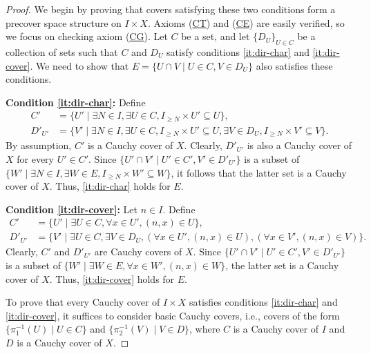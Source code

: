 \documentclass[pdflatex,sn-mathphys-num]{sn-jnl}
\newcommand{\axref}[1]{(\hyperref[ax:#1]{#1})}
\theoremstyle{definition}
\theoremstyle{remark}
\numberwithin{figure}{section}
\begin{document}
\begin{proof}

We begin by proving that covers satisfying these two conditions form a precover space structure on $I \times X$.
Axioms \axref{CT} and \axref{CE} are easily verified, so we focus on checking axiom \axref{CG}.
Let $C$ be a set, and let $\{ D_U \}_{U \in C}$ be a collection of sets such that $C$ and $D_U$ satisfy conditions \eqref{it:dir-char} and \eqref{it:dir-cover}.
We need to show that $E = \{ U \cap V \mid U \in C, V \in D_U \}$ also satisfies these conditions.

\textbf{Condition \eqref{it:dir-char}:}
Define
\begin{align*}
C' & = \{ U' \mid \exists N \in I, \exists U \in C, I_{\geq N} \times U' \subseteq U \}, \\
D'_{U'} & = \{ V' \mid \exists N \in I, \exists U \in C, I_{\geq N} \times U' \subseteq U, \exists V \in D_U, I_{\geq N} \times V' \subseteq V \}.
\end{align*}
By assumption, $C'$ is a Cauchy cover of $X$.
Clearly, $D'_{U'}$ is also a Cauchy cover of $X$ for every $U' \in C'$.
Since $\{ U' \cap V' \mid U' \in C', V' \in D'_{U'} \}$ is a subset of $\{ W' \mid \exists N \in I, \exists W \in E, I_{\geq N} \times W' \subseteq W \}$, it follows that the latter set is a Cauchy cover of $X$.
Thus, \eqref{it:dir-char} holds for $E$.

\textbf{Condition \eqref{it:dir-cover}:}
Let $n \in I$. Define
\begin{align*}
C' & = \{ U' \mid \exists U \in C, \forall x \in U', (n,x) \in U \}, \\
D'_{U'} & = \{ V' \mid \exists U \in C, \exists V \in D_U, (\forall x \in U', (n,x) \in U), (\forall x \in V', (n,x) \in V) \}.
\end{align*}
Clearly, $C'$ and $D'_{U'}$ are Cauchy covers of $X$.
Since $\{ U' \cap V' \mid U' \in C', V' \in D'_{U'} \}$ is a subset of $\{ W' \mid \exists W \in E, \forall x \in W', (n,x) \in W \}$, the latter set is a Cauchy cover of $X$.
Thus, \eqref{it:dir-cover} holds for $E$.

To prove that every Cauchy cover of $I \times X$ satisfies conditions \eqref{it:dir-char} and \eqref{it:dir-cover}, it suffices to consider basic Cauchy covers,
i.e., covers of the form $\{ \pi_1^{-1}(U) \mid U \in C \}$ and $\{ \pi_2^{-1}(V) \mid V \in D \}$, where $C$ is a Cauchy cover of $I$ and $D$ is a Cauchy cover of $X$.


\end{proof}
\end{document}

